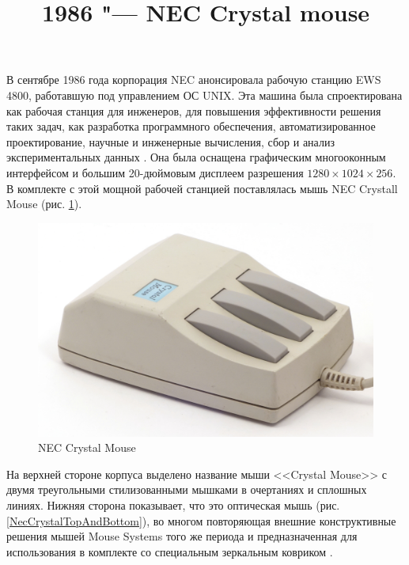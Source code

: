 \documentclass[11pt, a4paper]{article}
\begin{document}
\title{1986 "--- NEC Crystal mouse}
\date{}
\maketitle

В сентябре 1986 года корпорация NEC анонсировала рабочую станцию EWS 4800, работавшую под управлением ОС UNIX. Эта машина была спроектирована как рабочая станция для инженеров, для повышения эффективности решения таких задач, как разработка программного обеспечения, автоматизированное проектирование, научные и инженерные вычисления, сбор и анализ экспериментальных данных \cite{yt}. Она была оснащена графическим многооконным интерфейсом и большим 20-дюймовым дисплеем разрешения $1280 \times 1024 \times 256$. В комплекте с этой мощной рабочей станцией поставлялась мышь NEC Crystall Mouse (рис. \ref{fig:NECCrystalPic}).

\begin{figure}[h]
    \centering
    \includegraphics[scale=0.7]{1986_nec_crystal_mouse/necNorm_30.jpg}
    \caption{NEC Crystal Mouse}
    \label{fig:NECCrystalPic}
\end{figure}

На верхней стороне корпуса выделено название мыши <<Crystal Mouse>> с двумя треугольными стилизованными мышками в очертаниях и сплошных линиях. Нижняя сторона показывает, что это оптическая мышь (рис. \ref{NecCrystalTopAndBottom}), во многом повторяющая внешние конструктивные решения мышей Mouse Systems того же периода и предназначенная для использования в комплекте со специальным зеркальным ковриком \cite{photo}.
\end{document}
